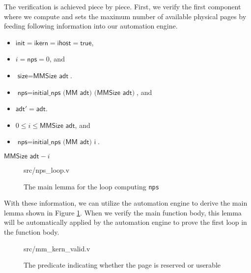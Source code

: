 The verification is achieved piece by piece. First, we verify the first component where
we compute and sets the maximum number of available physical pages by feeding
following information into our automation engine.

\begin{definition} 
\begin{itemize}
\item $\textsf{init} = \textsf{ikern} = \textsf{ihost} = \textsf{true}$,
\item $i=\textsf{nps}=0$, and
\item $\textsf{size}=\textsf{MMSize adt}$.
\end{itemize}
\end{definition}

\begin{definition} 
\begin{itemize}
\item $\textsf{nps}=\textsf{initial\_nps (MM adt) (MMSize adt)}$, and 
\item $\textsf{adt}'=\textsf{adt}$.
\end{itemize}
\end{definition}

\begin{definition}
\begin{itemize}
\item $0\le i \le \textsf{MMSize adt}$, and
\item $\textsf{nps}=\textsf{initial\_nps (MM adt) i}$.
\end{itemize}
\end{definition}

\begin{definition}
$\textsf{MMSize adt}-i$
\end{definition}

\begin{figure}
	 {src/nps_loop.v}
	\caption{The main lemma for the loop computing \texttt{nps}}
	\label{fig:nps_loop_v}
\end{figure}

With these information, we can utilize the automation engine to derive the main lemma shown in Figure \ref{fig:nps_loop_v}.
When we verify the main function body, this lemma will be automatically applied by the automation engine to prove
the first loop in the function body.

\begin{figure}
	 {src/mm_kern_valid.v}
	\caption{The predicate indicating whether the page is reserved or userable}
	\label{fig:mm_kern_valid_v}
\end{figure}

